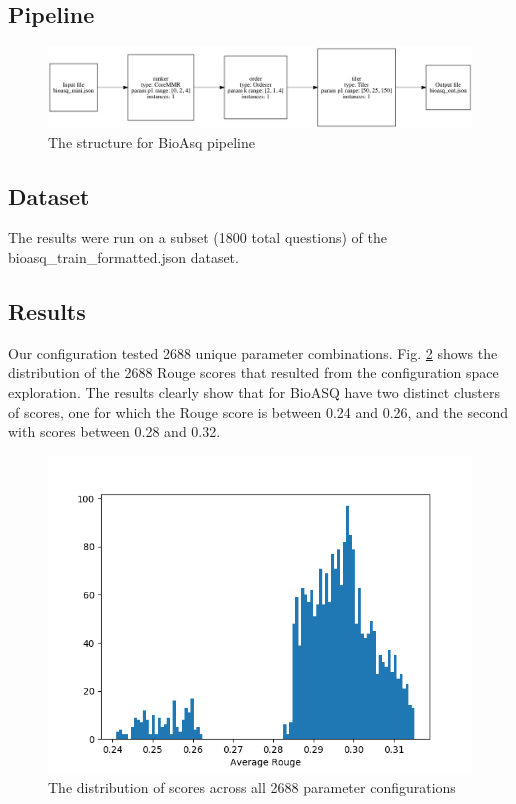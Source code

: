 \documentclass{article}
\begin{document}
    \subsection{Pipeline}
        \begin{figure}[H]
            \begin{center}
                \includegraphics[width=\textwidth]{fig/bioasq_pipeline.png}
            \end{center}
            \label{fig:bioasq_pipeline}
            \caption{The structure for BioAsq pipeline}
        \end{figure}

    \subsection{Dataset}
    The results were run on a subset (1800 total questions) of the bioasq\_train\_formatted.json dataset.


    \subsection{Results}

    Our configuration tested 2688 unique parameter combinations.
    Fig. \ref{fig:histogram} shows the distribution of the 2688 Rouge scores that resulted from the configuration space exploration.
    The results clearly show that for BioASQ have two distinct clusters of scores, one for which the Rouge score is between 0.24 and 0.26,
    and the second with scores between 0.28 and 0.32.

    \begin{figure}[H]
        \begin{center}
            \includegraphics[width=\textwidth]{fig/hist.png}
        \end{center}
        \caption{The distribution of scores across all 2688 parameter configurations}\label{fig:histogram}
    \end{figure}
\end{document}
